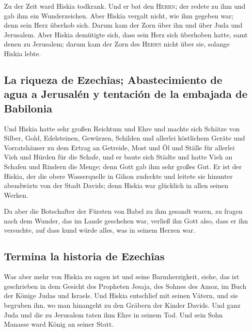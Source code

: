  Zu der Zeit ward Hiskia todkrank. Und er bat den
\textsc{Herrn}; der redete zu ihm und gab ihm ein Wunderzeichen.
 Aber Hiskia vergalt nicht, wie ihm gegeben war; denn
sein Herz überhob sich. Darum kam der Zorn über ihn und über Juda und
Jerusalem.  Aber Hiskia demütigte sich, dass sein Herz
sich überhoben hatte, samt denen zu Jerusalem; darum kam der Zorn des
\textsc{Herrn} nicht über sie, solange Hiskia lebte.

\hypertarget{la-riqueza-de-ezechuxeeas-abastecimiento-de-agua-a-jerusaluxe9n-y-tentaciuxf3n-de-la-embajada-de-babilonia}{%
\subsection{La riqueza de Ezechîas; Abastecimiento de agua a Jerusalén y
tentación de la embajada de
Babilonia}\label{la-riqueza-de-ezechuxeeas-abastecimiento-de-agua-a-jerusaluxe9n-y-tentaciuxf3n-de-la-embajada-de-babilonia}}

 Und Hiskia hatte sehr großen Reichtum und Ehre und
machte sich Schätze von Silber, Gold, Edelsteinen, Gewürzen, Schilden
und allerlei köstlichem Geräte  und Vorratshäuser zu dem
Ertrag an Getreide, Most und Öl und Ställe für allerlei Vieh und Hürden
für die Schafe,  und er baute sich Städte und hatte Vieh
an Schafen und Rindern die Menge; denn Gott gab ihm sehr großes Gut.
 Er ist der Hiskia, der die obere Wasserquelle in Gihon
zudeckte und leitete sie hinunter abendwärts von der Stadt Davids; denn
Hiskia war glücklich in allen seinen Werken.

 Da aber die Botschafter der Fürsten von Babel zu ihm
gesandt waren, zu fragen nach dem Wunder, das im Lande geschehen war,
verließ ihn Gott also, dass er ihn versuchte, auf dass kund würde alles,
was in seinem Herzen war.

\hypertarget{termina-la-historia-de-ezechuxeeas}{%
\subsection{Termina la historia de
Ezechîas}\label{termina-la-historia-de-ezechuxeeas}}

 Was aber mehr von Hiskia zu sagen ist und seine
Barmherzigkeit, siehe, das ist geschrieben in dem Gesicht des Propheten
Jesaja, des Sohnes des Amoz, im Buch der Könige Judas und Israels.
 Und Hiskia entschlief mit seinen Vätern, und sie
begruben ihn, wo man hinangeht zu den Gräbern der Kinder Davids. Und
ganz Juda und die zu Jerusalem taten ihm Ehre in seinem Tod. Und sein
Sohn Manasse ward König an seiner Statt.

